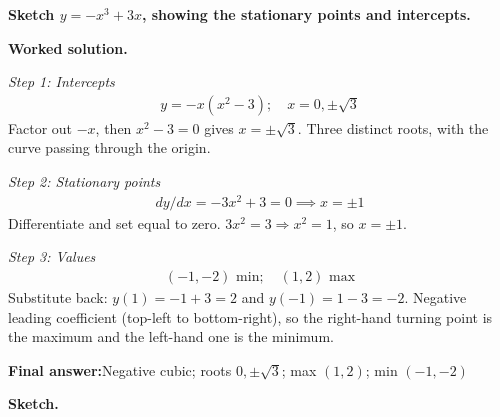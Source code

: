 \documentclass[11pt]{article}
\newcommand{\question}[1]{\par\medskip\noindent\textbf{#1}\par}
\begin{document}
\question{Sketch \( y = -x^3 + 3x \), showing the stationary points and intercepts.}

\textbf{Worked solution.}

\textit{Step 1: Intercepts}
\[\begin{gathered}
y = -x(x^2-3); \quad x = 0, \pm\sqrt{3}
\end{gathered}\]
Factor out \(-x\), then \( x^2 - 3 = 0 \) gives \( x = \pm\sqrt{3} \). Three distinct roots, with the curve passing through the origin.

\textit{Step 2: Stationary points}
\[\begin{gathered}
dy/dx = -3x^2 + 3 = 0 \implies x = \pm 1
\end{gathered}\]
Differentiate and set equal to zero. \( 3x^2 = 3 \Rightarrow x^2 = 1 \), so \( x = \pm 1 \).

\textit{Step 3: Values}
\[\begin{gathered}
(-1, -2) \text{ min}; \quad (1, 2) \text{ max}
\end{gathered}\]
Substitute back: \( y(1) = -1 + 3 = 2 \) and \( y(-1) = 1 - 3 = -2 \). Negative leading coefficient (top-left to bottom-right), so the right-hand turning point is the maximum and the left-hand one is the minimum.

\begin{answerbox}
\textbf{Final answer:}\quad Negative cubic; roots \(\displaystyle 0, \pm\sqrt{3}\); max \(\displaystyle (1,2)\); min \(\displaystyle (-1,-2)\)
\end{answerbox}
\textbf{Sketch.}
\end{document}
